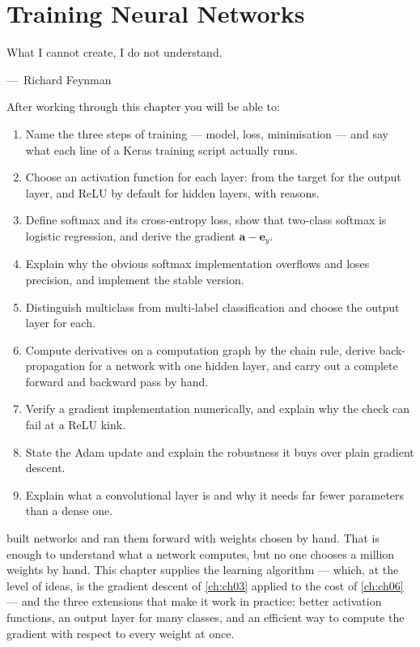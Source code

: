 
\chapter{Training Neural Networks}
\label{ch:ch09}

\epigraph{What I cannot create, I do not understand.}{---\ Richard Feynman}

\begin{chapterlearning}
After working through this chapter you will be able to:
\begin{enumerate}
  \item Name the three steps of training --- model, loss, minimisation --- and
        say what each line of a Keras training script actually runs.
  \item Choose an activation function for each layer: from the target for the
        output layer, and ReLU by default for hidden layers, with reasons.
  \item Define softmax and its cross-entropy loss, show that two-class softmax is
        logistic regression, and derive the gradient $\mathbf{a} - \mathbf{e}_y$.
  \item Explain why the obvious softmax implementation overflows and loses
        precision, and implement the stable version.
  \item Distinguish multiclass from multi-label classification and choose the
        output layer for each.
  \item Compute derivatives on a computation graph by the chain rule, derive
        back-propagation for a network with one hidden layer, and carry out a
        complete forward and backward pass by hand.
  \item Verify a gradient implementation numerically, and explain why the check
        can fail at a ReLU kink.
  \item State the Adam update and explain the robustness it buys over plain
        gradient descent.
  \item Explain what a convolutional layer is and why it needs far fewer
        parameters than a dense one.
\end{enumerate}
\end{chapterlearning}

 built networks and ran them forward with weights chosen by hand.
That is enough to understand what a network computes, but no one chooses a
million weights by hand. This chapter supplies the learning algorithm --- which,
at the level of ideas, is the gradient descent of \cref{ch:ch03} applied to the
cost of \cref{ch:ch06} --- and the three extensions that make it work in practice:
better activation functions, an output layer for many classes, and an efficient
way to compute the gradient with respect to every weight at once.

